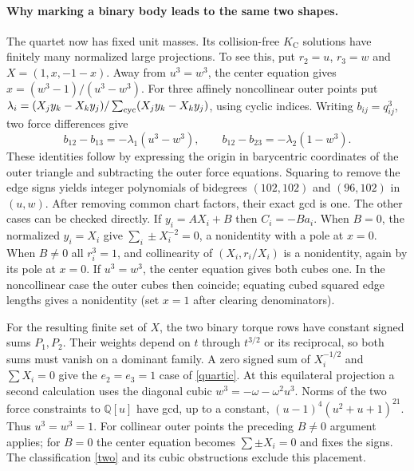 \documentclass[11pt]{article}
\newcommand{\Q}{\mathbb Q}
\newcommand{\KC}{K_{\mathrm C}}
\begin{document}
\paragraph{Why marking a binary body leads to the same two shapes.}
The quartet now has fixed unit masses. Its collision-free $\KC$ solutions have finitely many normalized large projections. To see this, put $r_2=u$, $r_3=w$ and $X=(1,x,-1-x)$. Away from $u^3=w^3$, the center equation gives $x=(w^3-1)/(u^3-w^3)$. For three affinely noncollinear outer points put
$\lambda_i=(X_jy_k-X_ky_j)/\sum_{\rm cyc}(X_jy_k-X_ky_j)$, using cyclic indices. Writing $b_{ij}=q_{ij}^3$, two force differences give
\[
 b_{12}-b_{13}=-\lambda_1(u^3-w^3),\qquad
 b_{12}-b_{23}=-\lambda_2(1-w^3).
\]
These identities follow by expressing the origin in barycentric coordinates of the outer triangle and subtracting the outer force equations. Squaring to remove the edge signs yields integer polynomials of bidegrees $(102,102)$ and $(96,102)$ in $(u,w)$. After removing common chart factors, their exact gcd is one. The other cases can be checked directly. If $y_i=A X_i+B$ then $C_i=-B a_i$. When $B=0$, the normalized $y_i=X_i$ give $\sum_i\pm X_i^{-2}=0$, a nonidentity with a pole at $x=0$. When $B\ne0$ all $r_i^3=1$, and collinearity of $(X_i,r_i/X_i)$ is a nonidentity, again by its pole at $x=0$. If $u^3=w^3$, the center equation gives both cubes one. In the noncollinear case the outer cubes then coincide; equating cubed squared edge lengths gives a nonidentity (set $x=1$ after clearing denominators).

For the resulting finite set of $X$, the two binary torque rows have constant signed sums $P_1,P_2$. Their weights depend on $t$ through $t^{3/2}$ or its reciprocal, so both sums must vanish on a dominant family. A zero signed sum of $X_i^{-1/2}$ and $\sum X_i=0$ give the $e_2=e_3=1$ case of \eqref{quartic}. At this equilateral projection a second calculation uses the diagonal cubic $w^3=-\omega-\omega^2u^3$. Norms of the two force constraints to $\Q[u]$ have gcd, up to a constant, $(u-1)^4(u^2+u+1)^{21}$. Thus $u^3=w^3=1$. For collinear outer points the preceding $B\ne0$ argument applies; for $B=0$ the center equation becomes $\sum\pm X_i=0$ and fixes the signs. The classification \eqref{two} and its cubic obstructions exclude this placement.
\end{document}
